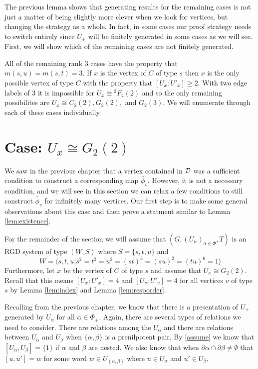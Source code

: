 \documentclass[class=book, crop=false]{standalone}
\begin{document}
The previous lemma shows that generating results for the remaining cases is not just a matter of being slightly more clever when we look for vertices, but changing the strategy as a whole. In fact, in some cases our proof strategy needs to switch entirely since $U_+$ will be finitely generated in some cases as we will see. First, we will show which of the remaining cases are not finitely generated.

All of the remaining rank 3 cases have the property that $m(s,u)=m(s,t)=3.$ If $x$ is the vertex of $C$ of type $s$ then $x$ is the only possible vertex of type $C$ with the property that $[U_x:U'_x]\ge 2.$ With two edge labels of $3$ it is impossible for $U_x\cong {}^2F_4(2)$ and so the only remaining possibilites are $U_x\cong C_2(2),G_2(2),$ and $G_2(3).$ We will enumerate through each of these cases individually.

\section{Case: $U_x\cong G_2(2)$}
We saw in the previous chapter that a vertex contained in $\mathcal{D}$ was a sufficient condition to construct a corresponding map $\tilde{\phi_v}.$ However, it is not a necessary condition, and we will see in this section we can relax a few conditions to still construct $\tilde{\phi_v}$ for infinitely many vertices. Our first step is to make some general observations about this case and then prove a statment similar to Lemma \ref{lem:existence}.

For the remainder of the section we will assume that $(G,(U_\alpha)_{\alpha\in \Phi},T)$ is an RGD system of type $(W,S)$ where $S=\{s,t,u\}$ and 
\[
	W=\langle s,t,u|s^2=t^2=u^2=(st)^3=(su)^3=(tu)^6=1\rangle
\]
Furthermore, let $x$ be the vertex of $C$ of type $s$ and assume that $U_x\cong G_2(2).$ Recall that this means $[U_x:U'_x]=4$ and $[U_v:U'_v]=4$ for all vertices $v$ of type $s$ by Lemma \ref{lem:index} and Lemma \ref{lem:resporder}.

Recalling from the previous chapter, we know that there is a presentation of $U_+$ generated by $U_\alpha$ for all $\alpha\in \Phi_+.$ Again, there are several types of relations we need to consider. There are relations among the $U_\alpha$ and there are relations between $U_\alpha$ and $U_\beta$ when $\{\alpha,\beta\}$ is a prenilpotent pair. By \eqref{assume} we know that $[U_\alpha,U_\beta]=\{1\}$ if $\alpha$ and $\beta$ are nested. We also know that when $\partial\alpha\cap \partial\beta\neq \emptyset$ that $[u,u']=w$ for some word $w\in U_{(\alpha,\beta)}$ where $u\in U_\alpha$ and $u'\in U_\beta.$ 
\end{document}
